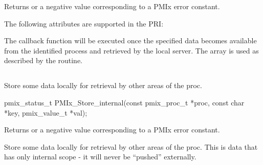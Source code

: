 \begin{arglist}
\end{arglist}

Returns  or a negative value corresponding to a PMIx error constant.

\priattr
The following attributes are supported in the \ac{PRI}:


\descr

The callback function will be executed once the specified data becomes available from the identified process and retrieved by the local server.
The  array is used as described by the  routine.


\subsection{}

\summary

Store some data locally for retrieval by other areas of the proc.

\format

\cspecificstart
\begin{codepar}
pmix_status_t
PMIx_Store_internal(const pmix_proc_t *proc,
                    const char *key, pmix_value_t *val);
\end{codepar}
\cspecificend

\begin{arglist}
\end{arglist}

Returns  or a negative value corresponding to a PMIx error constant.

\descr

Store some data locally for retrieval by other areas of the proc.
This is data that has only internal scope - it will never be ``pushed'' externally.


